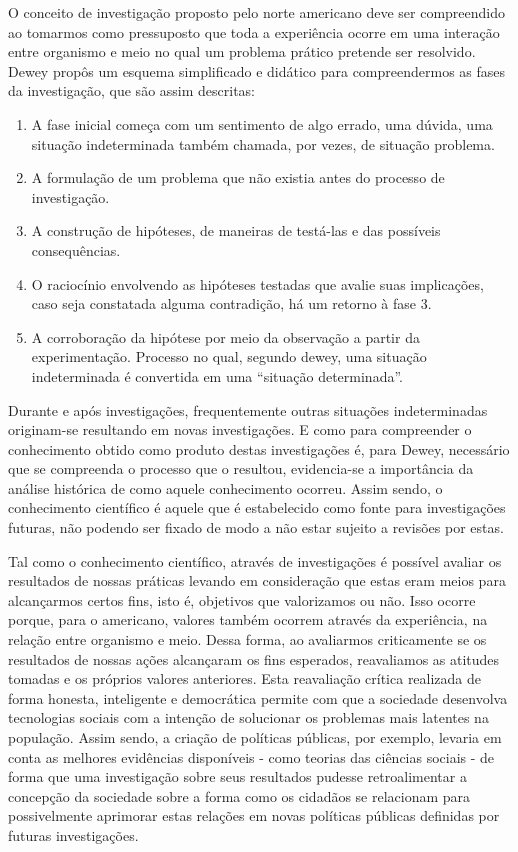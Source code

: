 \documentclass[12pt]{report}
\begin{document}
		O conceito de investigação proposto pelo norte americano deve ser compreendido ao tomarmos como pressuposto que toda a experiência ocorre em uma interação entre organismo e meio no qual um problema prático pretende ser resolvido. Dewey propôs um esquema simplificado e didático para compreendermos as fases da investigação, que são assim descritas:
	
			\begin{enumerate}
				\singlespacing
				\item A fase inicial começa com um sentimento de algo errado, uma dúvida, uma situação indeterminada também chamada, por vezes, de situação problema.
				\item A formulação de um problema que não existia antes do processo de investigação.
				\item A construção de hipóteses, de maneiras de testá-las e das possíveis consequências.
				\item O raciocínio envolvendo as hipóteses testadas que avalie suas implicações, caso seja constatada alguma contradição, há um retorno à fase 3.
				\item A corroboração da hipótese por meio da observação a partir da experimentação. Processo no qual, segundo dewey, uma situação indeterminada é convertida em uma “situação determinada”.
		\end{enumerate}
	
		\onehalfspacing 
		Durante e após investigações, frequentemente outras situações indeterminadas originam-se resultando em novas investigações. E como para compreender o conhecimento obtido como produto destas investigações é, para Dewey, necessário que se compreenda o processo que o resultou, evidencia-se a importância da análise histórica de como aquele conhecimento ocorreu. Assim sendo, o conhecimento científico é aquele que é estabelecido como fonte para investigações futuras, não podendo ser fixado de modo a não estar sujeito a revisões por estas.
		
		Tal como o conhecimento científico, através de investigações é possível avaliar os resultados de nossas práticas levando em consideração que estas eram meios para alcançarmos certos fins, isto é, objetivos que valorizamos ou não. Isso ocorre porque, para o americano, valores também ocorrem através da experiência, na relação entre organismo e meio. Dessa forma, ao avaliarmos criticamente se os resultados de nossas ações alcançaram os fins esperados, reavaliamos as atitudes tomadas e os próprios valores anteriores. Esta reavaliação crítica realizada de forma honesta, inteligente e democrática permite com que a sociedade desenvolva tecnologias sociais com a intenção de solucionar os problemas mais latentes na população. Assim sendo, a criação de políticas públicas, por exemplo, levaria em conta as melhores evidências disponíveis - como teorias das ciências sociais - de forma que uma investigação sobre seus resultados pudesse retroalimentar a concepção da sociedade sobre a forma como os cidadãos se relacionam para possivelmente aprimorar estas relações em novas políticas públicas definidas por futuras investigações.
		
\end{document}
